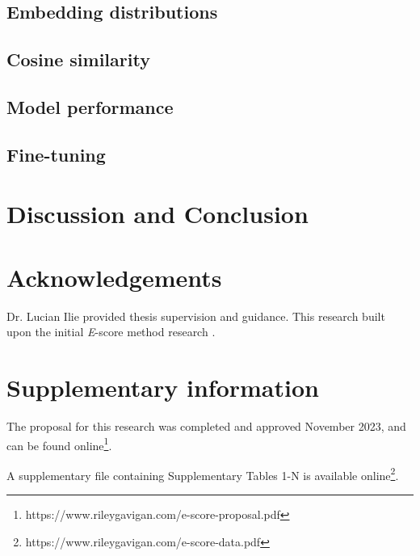 \documentclass[
	letterpaper, %
	10pt, %
]{journalArticle}
\begin{document}
\subsection{Embedding distributions}

\subsection{Cosine similarity}

\subsection{Model performance}

\subsection{Fine-tuning}

\section{Discussion and Conclusion}


\section{Acknowledgements}
Dr. Lucian Ilie provided thesis supervision and guidance. This research built upon the initial \textit{E}-score method research \autocite{Ashrafzadeh:2023}.

\section{Supplementary information}
The proposal for this research was completed and approved November 2023, and can be found online\footnote{https://www.rileygavigan.com/e-score-proposal.pdf}.

A supplementary file containing Supplementary Tables 1-N is available online\footnote{https://www.rileygavigan.com/e-score-data.pdf}.

\printbibliography %
\end{document}

